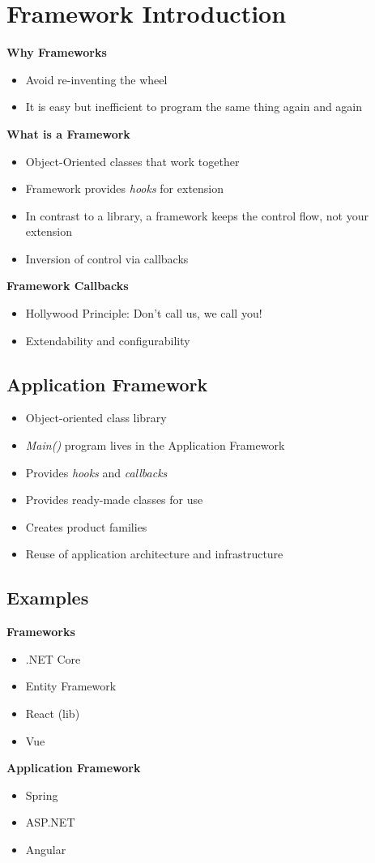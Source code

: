 \section{Framework Introduction}
\textbf{Why Frameworks}
\begin{itemize}
    \item Avoid re-inventing the wheel
    \item It is easy but inefficient to program the same thing again and again
\end{itemize}
\textbf{What is a Framework}
\begin{itemize}
    \item Object-Oriented classes that work together
    \item Framework provides \textit{hooks} for extension
    \item In contrast to a library, a framework keeps the control flow, not your extension
    \item Inversion of control via callbacks
\end{itemize}
\textbf{Framework Callbacks}
\begin{itemize}
    \item Hollywood Principle: Don't call us, we call you!
    \item Extendability and configurability
\end{itemize}
\subsection{Application Framework}
\begin{itemize}
    \item Object-oriented class library
    \item \textit{Main()} program lives in the Application Framework
    \item Provides \textit{hooks} and \textit{callbacks}
    \item Provides ready-made classes for use
    \item Creates product families
    \item Reuse of application architecture and infrastructure
\end{itemize}
\subsection{Examples}
\textbf{Frameworks}
\begin{itemize}
    \item .NET Core
    \item Entity Framework
    \item React (lib)
    \item Vue
\end{itemize}
\textbf{Application Framework}
\begin{itemize}
    \item Spring
    \item ASP.NET
    \item Angular
\end{itemize}

